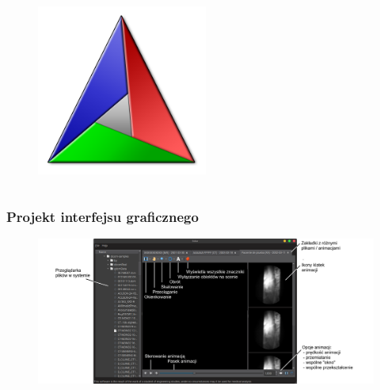 \documentclass[aspectratio=169]{beamer}
\begin{document}
\begin{frame}[t]
\begin{columns}[c]
        \begin{figure}
            \includegraphics[width=0.5\textwidth]{img/logo-cmake.png}
        \end{figure}

    \end{columns}
\end{frame}

\begin{frame}
    \frametitle{Projekt interfejsu graficznego}
    \begin{figure}
        \includegraphics[height=0.8\textheight]{img/sokar-gui-004.png}
    \end{figure}
\end{frame}
\end{document}
